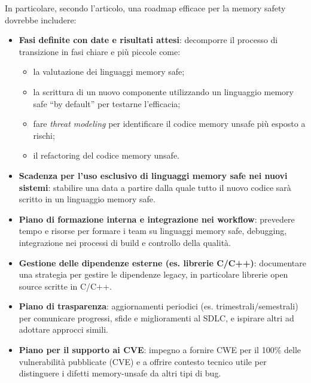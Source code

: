 In particolare, secondo l'articolo, una roadmap efficace per la memory safety dovrebbe
includere:

\begin{itemize}
  \item \textbf{Fasi definite con date e risultati attesi}: decomporre il processo
    di transizione in fasi chiare e più piccole come:
    \begin{itemize}
      \item la valutazione dei linguaggi memory safe;

      \item la scrittura di un nuovo componente utilizzando un linguaggio memory
        safe ``by default'' per testarne l'efficacia;

      \item fare \textit{threat modeling} per identificare il codice memory
        unsafe più esposto a rischi;

      \item il refactoring del codice memory unsafe.
    \end{itemize}

  \item \textbf{Scadenza per l'uso esclusivo di linguaggi memory safe nei nuovi
    sistemi}: stabilire una data a partire dalla quale tutto il nuovo codice sarà
    scritto in un linguaggio memory safe.

  \item \textbf{Piano di formazione interna e integrazione nei workflow}: prevedere
    tempo e risorse per formare i team su linguaggi memory safe, debugging, integrazione
    nei processi di build e controllo della qualità.

  \item \textbf{Gestione delle dipendenze esterne (es. librerie C/C++)}: documentare
    una strategia per gestire le dipendenze legacy, in particolare librerie open
    source scritte in C/C++.

  \item \textbf{Piano di trasparenza}: aggiornamenti periodici (es. trimestrali/semestrali)
    per comunicare progressi, sfide e miglioramenti al SDLC, e ispirare altri ad
    adottare approcci simili.

  \item \textbf{Piano per il supporto ai CVE}: impegno a fornire CWE per il 100\%
    delle vulnerabilità pubblicate (CVE) e a offrire contesto tecnico utile per
    distinguere i difetti memory-unsafe da altri tipi di bug.
\end{itemize}

